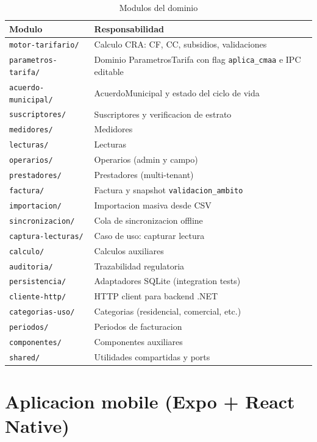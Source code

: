 \documentclass[11pt,a4paper,oneside]{report}
\begin{document}
\begin{table}[h]
\centering
\caption{Modulos del dominio}
\begin{tabularx}{\textwidth}{L{4.5cm} X}
\toprule
\textbf{Modulo} & \textbf{Responsabilidad} \\
\midrule
\texttt{motor-tarifario/} & Calculo CRA: CF, CC, subsidios, validaciones \\
\texttt{parametros-tarifa/} & Dominio ParametrosTarifa con flag \texttt{aplica\_cmaa} e IPC editable \\
\texttt{acuerdo-municipal/} & AcuerdoMunicipal y estado del ciclo de vida \\
\texttt{suscriptores/} & Suscriptores y verificacion de estrato \\
\texttt{medidores/} & Medidores \\
\texttt{lecturas/} & Lecturas \\
\texttt{operarios/} & Operarios (admin y campo) \\
\texttt{prestadores/} & Prestadores (multi-tenant) \\
\texttt{factura/} & Factura y snapshot \texttt{validacion\_ambito} \\
\texttt{importacion/} & Importacion masiva desde CSV \\
\texttt{sincronizacion/} & Cola de sincronizacion offline \\
\texttt{captura-lecturas/} & Caso de uso: capturar lectura \\
\texttt{calculo/} & Calculos auxiliares \\
\texttt{auditoria/} & Trazabilidad regulatoria \\
\texttt{persistencia/} & Adaptadores SQLite (integration tests) \\
\texttt{cliente-http/} & HTTP client para backend .NET \\
\texttt{categorias-uso/} & Categorias (residencial, comercial, etc.) \\
\texttt{periodos/} & Periodos de facturacion \\
\texttt{componentes/} & Componentes auxiliares \\
\texttt{shared/} & Utilidades compartidas y ports \\
\bottomrule
\end{tabularx}
\end{table}

\section{Aplicacion mobile (Expo + React Native)}
\end{document}
